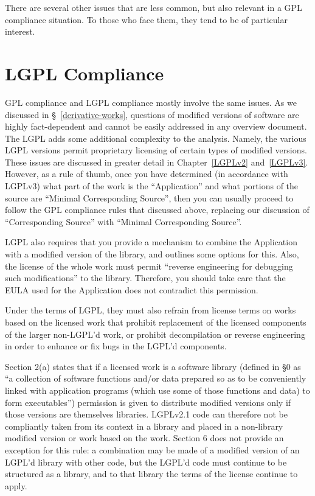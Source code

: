 There are several other issues that are less common, but also relevant in
a GPL compliance situation.  To those who face them, they tend to be of
particular interest.

\section{LGPL Compliance}
\label{lgpl}

GPL compliance and LGPL compliance mostly involve the same issues.  As we
discussed in \S~\ref{derivative-works}, questions of modified versions of
software are highly fact-dependent and cannot be easily addressed in any
overview document.  The LGPL adds some additional complexity to the
analysis.  Namely, the various LGPL versions permit proprietary licensing
of certain types of modified versions.  These issues are discussed in greater
detail in Chapter~\ref{LGPLv2} and~\ref{LGPLv3}.  However, as a rule of thumb, once you have determined
(in accordance with LGPLv3) what part of the work is the ``Application''
and what portions of the source are ``Minimal Corresponding Source'', then
you can usually proceed to follow the GPL compliance rules that
discussed above, replacing our discussion of ``Corresponding Source'' with
``Minimal Corresponding Source''.

LGPL also requires that you provide a mechanism to combine the Application
with a modified version of the library, and outlines some options for
this.  Also, the license of the whole work must permit ``reverse
engineering for debugging such modifications'' to the library.  Therefore,
you should take care that the EULA used for the Application does not
contradict this permission.


Under the terms of LGPL, they must also refrain from license terms on works
based on the licensed work that prohibit replacement of the licensed
components of the larger non-LGPL’d work, or prohibit decompilation or
reverse engineering in order to enhance or fix bugs in the LGPL’d components.

Section 2(a) states that if a licensed work is a software library (defined in
\S0 as ``a collection of software functions and/or data prepared so as to be
conveniently linked with application programs (which use some of those
functions and data) to form executables'') permission is given to distribute
modified versions only if those versions are themselves libraries. LGPLv2.1
code can therefore not be compliantly taken from its context in a library and
placed in a non-library modified version or work based on the work. Section 6
does not provide an exception for this rule: a combination may be made of a
modified version of an LGPL’d library with other code, but the LGPL’d code
must continue to be structured as a library, and to that library the terms of
the license continue to apply.

